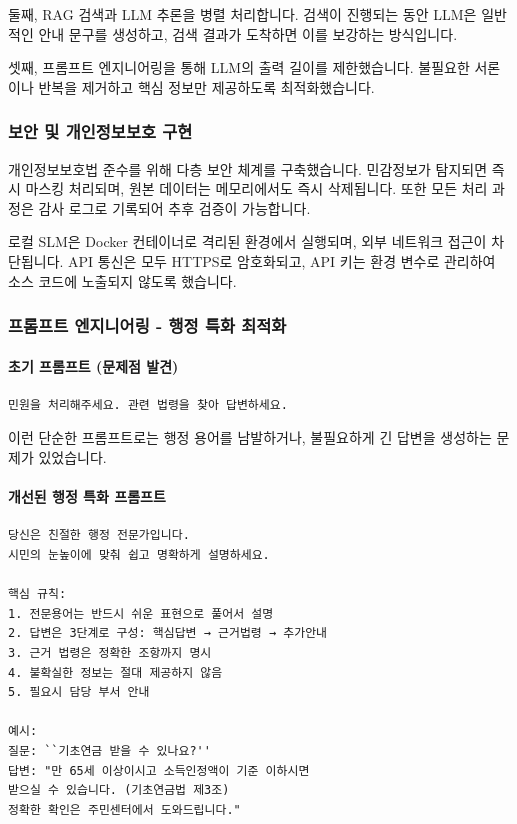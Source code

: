둘째, RAG 검색과 LLM 추론을 병렬 처리합니다. 검색이 진행되는 동안 LLM은 일반적인 안내 문구를 생성하고, 검색 결과가 도착하면 이를 보강하는 방식입니다.

셋째, 프롬프트 엔지니어링을 통해 LLM의 출력 길이를 제한했습니다. 불필요한 서론이나 반복을 제거하고 핵심 정보만 제공하도록 최적화했습니다.

 \subsubsection{보안 및 개인정보보호 구현}

 개인정보보호법 준수를 위해 다층 보안 체계를 구축했습니다. 민감정보가 탐지되면 즉시 마스킹 처리되며, 원본 데이터는 메모리에서도 즉시 삭제됩니다. 또한 모든 처리 과정은 감사 로그로 기록되어 추후 검증이 가능합니다.

로컬 SLM은 Docker 컨테이너로 격리된 환경에서 실행되며, 외부 네트워크 접근이 차단됩니다. API 통신은 모두 HTTPS로 암호화되고, API 키는 환경 변수로 관리하여 소스 코드에 노출되지 않도록 했습니다.


\subsubsection{프롬프트 엔지니어링 - 행정 특화 최적화}

\paragraph{초기 프롬프트 (문제점 발견)}\smallskip
\begin{verbatim}
민원을 처리해주세요. 관련 법령을 찾아 답변하세요.
\end{verbatim}

이런 단순한 프롬프트로는 행정 용어를 남발하거나, 불필요하게 긴 답변을 생성하는 문제가 있었습니다.

\paragraph{개선된 행정 특화 프롬프트}\smallskip
\begin{verbatim}
당신은 친절한 행정 전문가입니다.
시민의 눈높이에 맞춰 쉽고 명확하게 설명하세요.

핵심 규칙:
1. 전문용어는 반드시 쉬운 표현으로 풀어서 설명
2. 답변은 3단계로 구성: 핵심답변 → 근거법령 → 추가안내
3. 근거 법령은 정확한 조항까지 명시
4. 불확실한 정보는 절대 제공하지 않음
5. 필요시 담당 부서 안내

예시:
질문: ``기초연금 받을 수 있나요?''
답변: "만 65세 이상이시고 소득인정액이 기준 이하시면 
받으실 수 있습니다. (기초연금법 제3조) 
정확한 확인은 주민센터에서 도와드립니다."
\end{verbatim}

